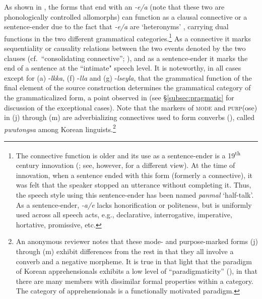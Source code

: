 \documentclass[output=paper,colorlinks,citecolor=brown]{langscibook}
\begin{document}
As shown in , the forms that end with an \textit{-e/a} (note that these two are phonologically controlled allomorphs) can function as a clausal connective or a sentence-ender due to the fact that \textit{-e/a} are `heteronyms' \citep{Lichtenberk1991}, carrying dual functions in the two different grammatical categories.\footnote{The connective function is older and its use as a sentence-ender is a 19\textsuperscript{th} century innovation (\citealt[139--141]{Suh1993}; see, however, \citealt{Park1996} for a different view). At the time of innovation, when a sentence ended with this form (formerly a connective), it was felt that the speaker stopped an utterance without completing it. Thus, the speech style using this sentence-ender has been named \textit{panmal} `half-talk'. As a sentence-ender, \textit{-a/e} lacks honorification or politeness, but is uniformly used across all speech acts, e.g., declarative, interrogative, imperative, hortative, promissive, etc.} As a connective it marks sequentiality or causality relations between the two events denoted by the two clauses (cf.\ ``consolidating connective''; \citealt{Koo1987}), and as a sentence-ender it marks the end of a sentence at the ``intimate" speech level. It is noteworthy, in all cases except for (a) \nobreakdash-\textit{lkka}, (f) \nobreakdash-\textit{lla} and (g) \nobreakdash-\textit{lseyla}, that the grammatical function of the final element of the source construction determines the grammatical category of the grammaticalized form, a point observed in \citet{Rhee2007} (see §\ref{subsec:pragmatic} for discussion of the exceptional cases). Note that the markers of \textsc{mode} and \textsc{purp}(ose) in (j) through (m) are adverbializing connectives used to form converbs (\citealt{Ramstedt1903,Ramstedt1997,Haspelmath1995}), called \textit{pwutongsa} among Korean linguists.\footnote{An anonymous reviewer notes that these mode- and purpose-marked forms (j) through (m) exhibit differences from the rest in that they all involve a converb and a negative morpheme. It is true in that light that the paradigm of Korean apprehensionals exhibits a low level of ``paradigmaticity'' (\citealt{Lehmann2015}), in that there are many members with dissimilar formal properties within a category. The category of apprehensionals is a functionally motivated paradigm.}  
\end{document}
